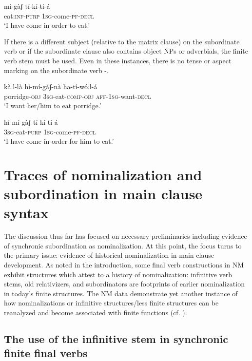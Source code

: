\documentclass[output=paper]{langsci/langscibook}
\begin{document}
\ea\label{ex:mahland:49}
\gll mì-gàʃ            tí-kí-ti-á\\
eat:\textsc{inf-purp   1sg}{}-come\textsc{{}-pf-decl} \\
\glt `I have come in order to eat.'
\z

If there is a different subject (relative to the matrix clause) on the subordinate verb or if the subordinate clause also contains object NPs or adverbials, the finite verb stem must be used. Even in these instances, there is no tense or aspect marking on the subordinate verb -.

\ea\label{ex:mahland:50}
\gll kàːl-là            hí-mí-gàʃ-nà           ha-tí-wóːl-{\downstep}á  \\
porridge-\textsc{obj   3sg-}eat-\textsc{comp-obj}   \textsc{aff-1sg-}want-\textsc{decl}  \\
\glt `I want her/him to eat porridge.'
\z

\ea\label{ex:mahland:51}
\gll hí-mí-gàʃ          tí-kí-ti-á\\
\textsc{3sg}{}-eat-\textsc{purp   1sg}{}-come-\textsc{pf-decl} \\
\glt `I have come in order for him to eat.'
\z

\section{Traces of nominalization and subordination in main clause syntax}\label{sec:mahland:3}

The discussion thus far has focused on necessary preliminaries including evidence of synchronic subordination as nominalization. At this point, the focus turns to the primary issue: evidence of historical nominalization in main clause development. As noted in the introduction, some final verb constructions in NM exhibit structures which attest to a history of nominalization: infinitive verb stems, old relativizers, and subordinators are footprints of earlier nominalization in today's finite structures. The NM data demonstrate yet another instance of how nominalizations or infinitive structures/less finite structures can be reanalyzed and become associated with finite functions (cf. \citealt{Givon2009, DeLancey2011}).


\subsection{The use of the infinitive stem in synchronic finite final verbs}\label{sec:mahland:3.1}
\end{document}
